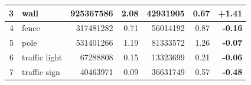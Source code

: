 \documentclass[a4paper,12pt]{report}
\begin{document}
\begin{table}[]
{\begin{tabular}{|r|l|r|r|r|r|r|}
            3                                                                                      & wall          & 925367586                           & 2.08                                                                                   & 42931905                                                                              & 0.67                                                                                        & \textbf{+1.41}                                                                                                   \\ \hline
            4                                                                                      & fence         & 317481282                           & 0.71                                                                                   & 56014192                                                                              & 0.87                                                                                        & \textbf{-0.16}                                                                                                   \\ \hline
            5                                                                                      & pole          & 531401266                           & 1.19                                                                                   & 81333572                                                                              & 1.26                                                                                        & \textbf{-0.07}                                                                                                   \\ \hline
            6                                                                                      & traffic light & 67288808                            & 0.15                                                                                   & 13323699                                                                              & 0.21                                                                                        & \textbf{-0.06}                                                                                                   \\ \hline
            7                                                                                      & traffic sign  & 40463971                            & 0.09                                                                                   & 36631749                                                                              & 0.57                                                                                        & \textbf{-0.48}                                                                                                   \\ \hline

\end{tabular}}
\end{table}
\end{document}
